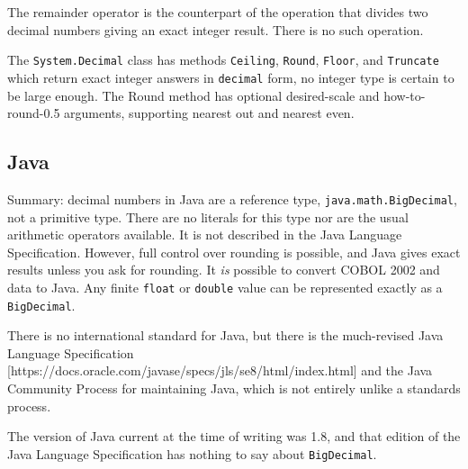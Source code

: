 \documentclass{article}
\begin{document}
The remainder operator is the counterpart of the operation that
divides two decimal numbers giving an exact integer result.
There is no such operation.

The {\tt System.Decimal} class has methods {\tt Ceiling},
{\tt Round}, {\tt Floor}, and {\tt Truncate} which return exact
integer answers in {\tt decimal} form, no integer
type is certain to be large enough.  The Round method has
optional desired-scale and how-to-round-0.5 arguments,
supporting nearest out and nearest even.


\subsection{Java}

Summary: decimal numbers in Java are a reference type,
{\tt java.math.BigDecimal}, not a primitive type.
There are no literals for this type nor
are the usual arithmetic operators available.
It is not described in the Java Language Specification.
However, full control over rounding is possible, and
Java gives exact results unless you ask for rounding.
It {\it is} possible to convert COBOL 2002 and data to
Java.  Any finite {\tt float} or {\tt double} value can
be represented exactly as a {\tt BigDecimal}.

There is no international standard for Java, but there is the
much-revised Java Language Specification
[https://docs.oracle.com/javase/specs/jls/se8/html/index.html]
and the Java Community Process for maintaining Java, which is not
entirely unlike a standards process.

The version of Java current at the time of writing was 1.8,
and that edition of the Java Language Specification has nothing to say
about {\tt BigDecimal}.
\end{document}
